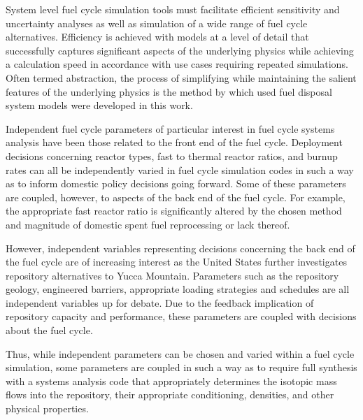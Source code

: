 
System level fuel cycle simulation tools must facilitate efficient sensitivity 
and uncertainty analyses as well as simulation of a wide range of fuel cycle 
alternatives.  Efficiency is achieved with models at a level of detail that 
successfully captures significant aspects of the underlying physics while 
achieving a calculation speed in accordance with use cases requiring repeated 
simulations. Often termed abstraction, the process of simplifying while 
maintaining the salient features of the underlying physics is the method by 
which used fuel disposal system models were developed in this work. 


Independent fuel cycle parameters of particular interest in fuel cycle systems 
analysis have been those related to the front end of the fuel cycle. Deployment 
decisions concerning reactor types, fast to thermal reactor ratios, and burnup 
rates can all be independently varied in fuel cycle simulation codes in such a 
way as to inform domestic policy decisions going forward. Some of these 
parameters are coupled, however, to aspects of the back end of the fuel cycle.  
For example, the appropriate fast reactor ratio is significantly altered by the 
chosen method and magnitude of domestic spent fuel reprocessing or lack 
thereof.


However, independent variables representing decisions concerning the back end
of the fuel cycle are of increasing interest as the United States further
investigates repository alternatives to Yucca Mountain.  Parameters such as the
repository geology, engineered barriers, appropriate loading strategies and
schedules are all independent variables up for debate. Due to the feedback 
implication of repository capacity and performance, these
parameters are coupled with decisions about the fuel cycle. 


Thus, while independent parameters can be chosen and varied
within a fuel cycle simulation, some parameters are coupled in such a way as to
require full synthesis with a systems analysis code that appropriately
determines the isotopic mass flows into the repository, their appropriate
conditioning, densities, and other physical properties.  

